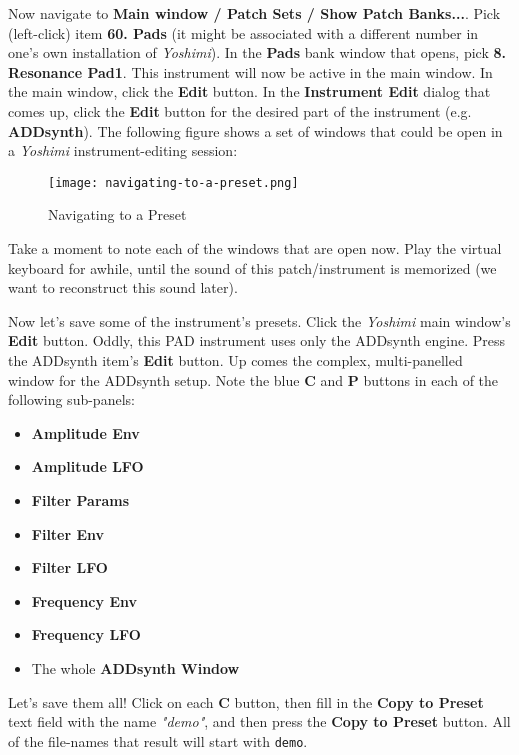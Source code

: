   Now navigate to
   \textbf{Main window / Patch Sets / Show Patch Banks...}.
   Pick (left-click) item \textbf{60. Pads} (it might be associated with a
   different number in one's own installation of \textsl{Yoshimi}).
   In the \textbf{Pads} bank window that opens, pick \textbf{8. Resonance Pad1}.
   This instrument will now be active in the main window.
   In the main window, click the \textbf{Edit} button.  In the
   \textbf{Instrument Edit} dialog that comes up, click the \textbf{Edit}
   button for the desired part of the instrument (e.g. \textbf{ADDsynth}).
   The following figure shows a set of windows that could be open in a
   \textsl{Yoshimi} instrument-editing session:

\begin{figure}[H]
   \centering 
   \texttt{[image: navigating-to-a-preset.png]}
   \caption{Navigating to a Preset}
   \label{fig:presets_navigating_to_a_preset}
\end{figure}

   Take a moment to note each of the windows that are open now.
   Play the virtual keyboard for awhile, until the sound of this
   patch/instrument is memorized (we want to reconstruct this sound later).

   Now let's save some of the instrument's presets.
   Click the \textsl{Yoshimi} main window's \textbf{Edit} button.
   Oddly, this PAD instrument uses only the ADDsynth engine.
   Press the ADDsynth item's \textbf{Edit} button.
   Up comes the complex, multi-panelled window for the ADDsynth setup.
   Note the blue \textbf{C} and \textbf{P} buttons in each of the following
   sub-panels:

   \begin{itemize}
      \item \textbf{Amplitude Env}
      \item \textbf{Amplitude LFO}
      \item \textbf{Filter Params}
      \item \textbf{Filter Env}
      \item \textbf{Filter LFO}
      \item \textbf{Frequency Env}
      \item \textbf{Frequency LFO}
      \item The whole \textbf{ADDsynth Window}
   \end{itemize}

   Let's save them all!  Click on each \textbf{C} button,
   then fill in the \textbf{Copy to Preset} text field with
   the name \textsl{"demo"}, and then press the \textbf{Copy to Preset}
   button.  All of the file-names that result will start with
   \texttt{demo}.

